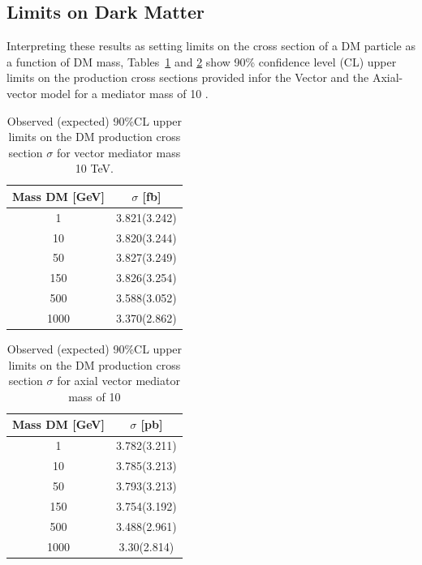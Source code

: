  \subsection{Limits on Dark Matter}
\label{ssec:lim_DM}
Interpreting these results as setting limits on the
 cross section of a DM particle as a function of 
 DM mass, Tables~\ref{table:vxslimits} and \ref{table:avxslimits}
 show 90\% confidence level (CL) upper limits on the
 production cross sections provided infor the Vector
 and the Axial-vector model for a mediator mass of 10 \TeV. 


\begin{table}[ht]
\caption[Upper limits on DM cross section for vector $m_M = 10$ \TeV]
{Observed (expected) 90\%CL upper limits on the DM production cross section $\sigma$ for vector mediator mass 10 TeV. }
\centering
\begin{tabular}{cc}
\hline\hline
Mass DM [GeV] & $\sigma$ [fb] \\
\hline
1  & 3.821(3.242)  \\  
\hline
10  & 3.820(3.244)  \\  
\hline
50  & 3.827(3.249) \\
\hline
150  & 3.826(3.254)\\
\hline 
500  & 3.588(3.052) \\
\hline
1000  & 3.370(2.862) \\
\hline
\end{tabular}
\label{table:vxslimits}
\end{table}

\begin{table}[htb]
\caption[Upper limits on DM cross section for axial-vector $m_M = 10$ \TeV]{Observed (expected) 90\%CL upper limits on the DM production cross section $\sigma$ for axial vector  mediator mass of 10 \TeV }
\centering
\begin{tabular}{cc}
\hline\hline
Mass DM [GeV] & $\sigma$ [pb] \\
\hline
1  & 3.782(3.211)  \\  
\hline
10  & 3.785(3.213) \\
\hline
50  & 3.793(3.213) \\
\hline
150  & 3.754(3.192)\\
\hline
500  & 3.488(2.961)\\
\hline
1000  & 3.30(2.814)\\
\hline
\end{tabular}
\label{table:avxslimits}
\end{table}



